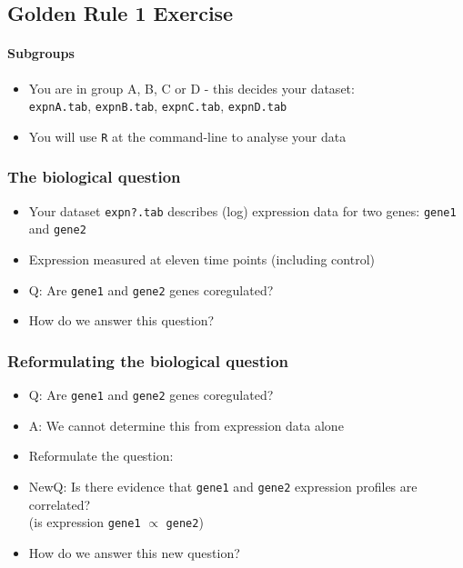 %

\subsection{Golden Rule 1 Exercise}
\begin{frame}
  \framesubtitle{Subgroups}
  \begin{itemize}
    \item You are in group A, B, C or D - this decides your dataset: \\
             \texttt{expnA.tab}, \texttt{expnB.tab}, \texttt{expnC.tab}, \texttt{expnD.tab}
    \item You will use \texttt{R} at the command-line to analyse your data
  \end{itemize}
\end{frame}
  
\begin{frame}
  \frametitle{The biological question}
  \begin{itemize}
    \item Your dataset \texttt{expn?.tab} describes (log) expression data for two genes: \texttt{gene1} and \texttt{gene2}
    \item Expression measured at eleven time points (including control)
    \item Q: Are \texttt{gene1} and \texttt{gene2} genes coregulated?
    \item How do we answer this question?
  \end{itemize}
\end{frame}  

\begin{frame}
  \frametitle{Reformulating the biological question}
  \begin{itemize}
    \item<1-> Q: Are \texttt{gene1} and \texttt{gene2} genes coregulated?
    \item<1-> A: We cannot determine this from expression data alone
    \item<2-> Reformulate the question:
    \item<2-> NewQ: Is there evidence that \texttt{gene1} and \texttt{gene2} expression profiles are correlated? \\
                   (is expression \texttt{gene1} $\propto$ \texttt{gene2})
    \item<2-> How do we answer this new question?
  \end{itemize}
\end{frame}


